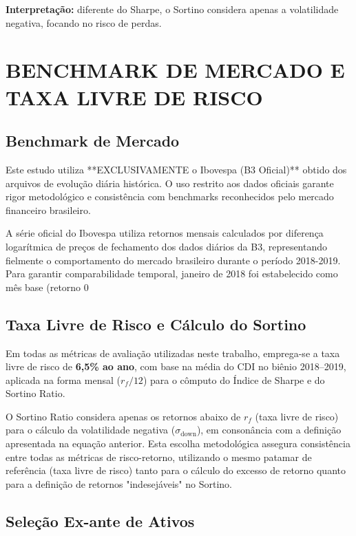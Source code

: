 \textbf{Interpretação:} diferente do Sharpe, o Sortino considera apenas a volatilidade negativa, focando no risco de perdas.

\section{BENCHMARK DE MERCADO E TAXA LIVRE DE RISCO}

\subsection{Benchmark de Mercado}

Este estudo utiliza **EXCLUSIVAMENTE o Ibovespa (B3 Oficial)** obtido dos arquivos de evolução diária histórica. O uso restrito aos dados oficiais garante rigor metodológico e consistência com benchmarks reconhecidos pelo mercado financeiro brasileiro.

A série oficial do Ibovespa utiliza retornos mensais calculados por diferença logarítmica de preços de fechamento dos dados diários da B3, representando fielmente o comportamento do mercado brasileiro durante o período 2018-2019. Para garantir comparabilidade temporal, janeiro de 2018 foi estabelecido como mês base (retorno 0%

\subsection{Taxa Livre de Risco e Cálculo do Sortino}

Em todas as métricas de avaliação utilizadas neste trabalho, emprega-se a taxa livre de risco de \textbf{6{,}5\% ao ano}, com base na média do CDI no biênio 2018–2019, aplicada na forma mensal ($r_f/12$) para o cômputo do Índice de Sharpe e do Sortino Ratio. 

O Sortino Ratio considera apenas os retornos abaixo de $r_f$ (taxa livre de risco) para o cálculo da volatilidade negativa ($\sigma_{\text{down}}$), em consonância com a definição apresentada na equação anterior. Esta escolha metodológica assegura consistência entre todas as métricas de risco-retorno, utilizando o mesmo patamar de referência (taxa livre de risco) tanto para o cálculo do excesso de retorno quanto para a definição de retornos "indesejáveis" no Sortino.

\subsection{Seleção Ex-ante de Ativos}

